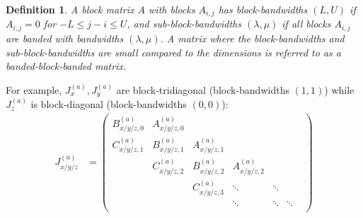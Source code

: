 \documentclass[11pt, oneside]{article}   	%
\newtheorem{definition}{Definition}
\begin{document}
\begin{definition}
A block matrix $A$ with blocks $A_{i,j}$ has block-bandwidths $(L,U)$ if $A_{i,j} = 0$ for $- L \leq j-i \leq U$, and sub-block-bandwidths $(\lambda, \mu)$ if all blocks $A_{i,j}$ are banded with bandwidths $(\lambda,\mu)$. A matrix where the block-bandwidths and sub-block-bandwidths are small compared to the dimensions is referred to as a banded-block-banded matrix. 
\end{definition}

For example, $J_x^{(a)}, J_y^{(a)}$ are block-tridiagonal (block-bandwidths $(1,1)$) while $J_z^{(a)}$ is block-diagonal (block-bandwidths $(0,0)$):
\begin{align*}
	J_{x/y/z}^{(a)} &= 
		\begin{pmatrix}
			B^{(a)}_{x/y/z, 0} & A^{(a)}_{x/y/z, 0} & & & & \\
			C^{(a)}_{x/y/z, 1} & B^{(a)}_{x/y/z, 1} & A^{(a)}_{x/y/z, 1} & & & \\
			& C^{(a)}_{x/y/z, 2} & B^{(a)}_{x/y/z, 2} & A^{(a)}_{x/y/z, 2} & & & \\
			& & C^{(a)}_{x/y/z, 3} & \ddots & \ddots & \\
			& & & \ddots & \ddots & \ddots \\
		\end{pmatrix}
\end{align*}
\end{document}
